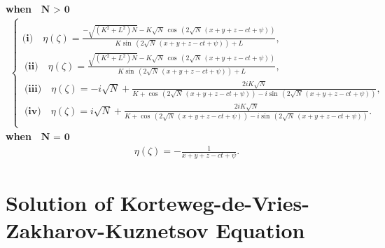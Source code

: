 \documentclass[10pt]{NSP1}
\numberwithin{equation}{section}
\begin{document}
\textbf{when $\textbf{ N $>$ 0} $ }
\noindent
\begin{align}\label{FAM2}
\begin{cases}\\
\textbf{(i)}\quad \eta \! \left(\zeta \right) =\frac{-\sqrt{\left(K^{2}+L^{2}\right) N}-K \sqrt{N}\, \cos \, \left(2 \sqrt{N}\, \left(x+y+z-ct +\psi \right)\right)}{K \sin \, \left(2 \sqrt{N}\, \left(x+y+z-ct +\psi \right)\right)+L},\\\
\textbf{(ii)}\quad \eta \! \left(\zeta \right) =\frac{\sqrt{\left(K^{2}+L^{2}\right) N}-K \sqrt{N}\, \cos \, \left(2 \sqrt{N}\, \left(x+y+z-ct +\psi \right)\right)}{K \sin \, \left(2 \sqrt{N}\, \left(x+y+z-ct +\psi \right)\right)+L},\\\
\textbf{(iii)}\quad \eta \! \left(\zeta \right) =-i \sqrt{N}+\frac{2 i K \sqrt{N}}{K +\cos \, \left(2 \sqrt{N}\, \left(x+y+z-ct +\psi \right)\right)-i \sin \, \left(2 \sqrt{N}\, \left(x+y+z-ct +\psi \right)\right)},\\\
\textbf{(iv)}\quad \eta \! \left(\zeta \right) =i \sqrt{N}+\frac{2 i K \sqrt{N}}{K +\cos \, \left(2 \sqrt{N}\, \left(x+y+z-ct +\psi \right)\right)-i \sin \, \left(2 \sqrt{N}\, \left(x+y+z-ct +\psi \right)\right)}.\\
\end{cases}
\end{align}
\textbf{when $\textbf{ N $=$ 0}$ }
\begin{eqnarray}\label{FAM3}
\quad \eta \! \left(\zeta \right) = -\frac{1}{x+y+z-ct +\psi}.
\end{eqnarray}
\section{Solution of Korteweg-de-Vries-Zakharov-Kuznetsov Equation}
\end{document}
